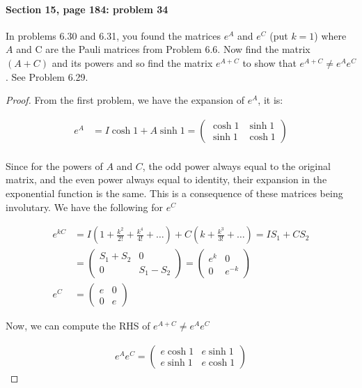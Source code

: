 \documentclass{article}
\begin{document}
\paragraph{Section 15, page 184: problem 34}	
In problems 6.30 and 6.31, you found the matrices $e^A$ and $e^C$ (put $k = 1$) where $A$
and C are the Pauli matrices from Problem 6.6. Now find the matrix $(A+C)$ and its
powers and so find the matrix $e^{A+C}$ to show that $e^{A+C} \neq e^A e^C$. See Problem 6.29.

\begin{proof}

From the first problem, we have the expansion of $e^{A}$, it is:

\begin{align*}
e^A &= I \cosh 1 + A \sinh 1 = \begin{pmatrix}
\cosh 1 & \sinh 1 \\ \sinh 1 & \cosh 1
\end{pmatrix} \\
\end{align*}

Since for the powers of $A$ and $C$, the odd power always equal to the original matrix, and the even power always equal to identity, their expansion in the exponential function is the same. This is a consequence of these matrices being involutary. We have the following for $e^C$

\begin{align*}
e^{kC} &= I (1 + \frac{k^2}{2!} + \frac{k^4}{4!} + \ldots )+ C (k + \frac{k^3}{3!} + \ldots ) 
= I S_1 + C S_2 \\ &= \begin{pmatrix}
S_1 + S_2 & 0 \\ 0 & S_1 - S_2
\end{pmatrix} = \begin{pmatrix}
e^{k} & 0 \\ 0 & e^{-k}
\end{pmatrix} \\
e^C &= \begin{pmatrix}
e & 0 \\ 0 & e
\end{pmatrix}
\end{align*}

Now, we can compute the RHS of $e^{A+C} \neq e^{A}e^{C}$

\begin{align*}
e^{A}e^{C} = \begin{pmatrix}
e \cosh 1 & e \sinh 1 \\ e \sinh 1 & e \cosh 1
\end{pmatrix}
\end{align*} 


\end{proof}
\end{document}
